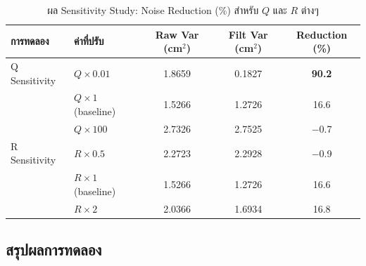 \begin{table}[htbp]
    \centering
    \caption{ผล Sensitivity Study: Noise Reduction (\%) สำหรับ $Q$ และ $R$ ต่างๆ}
    \label{tab:exp5_sensitivity}
    \begin{tabular}{llccc}
        \hline
        \textbf{การทดลอง} & \textbf{ค่าที่ปรับ} &
        \textbf{Raw Var (cm$^2$)} & \textbf{Filt Var (cm$^2$)} &
        \textbf{Reduction (\%)} \\
        \hline
        Q Sensitivity & $Q \times 0.01$ & 1.8659 & 0.1827 & \textbf{90.2} \\
                      & $Q \times 1$ (baseline) & 1.5266 & 1.2726 & 16.6 \\
                      & $Q \times 100$ & 2.7326 & 2.7525 & $-$0.7 \\
        \hline
        R Sensitivity & $R \times 0.5$ & 2.2723 & 2.2928 & $-$0.9 \\
                      & $R \times 1$ (baseline) & 1.5266 & 1.2726 & 16.6 \\
                      & $R \times 2$ & 2.0366 & 1.6934 & 16.8 \\
        \hline
    \end{tabular}
\end{table}

\clearpage

\subsection{สรุปผลการทดลอง}

